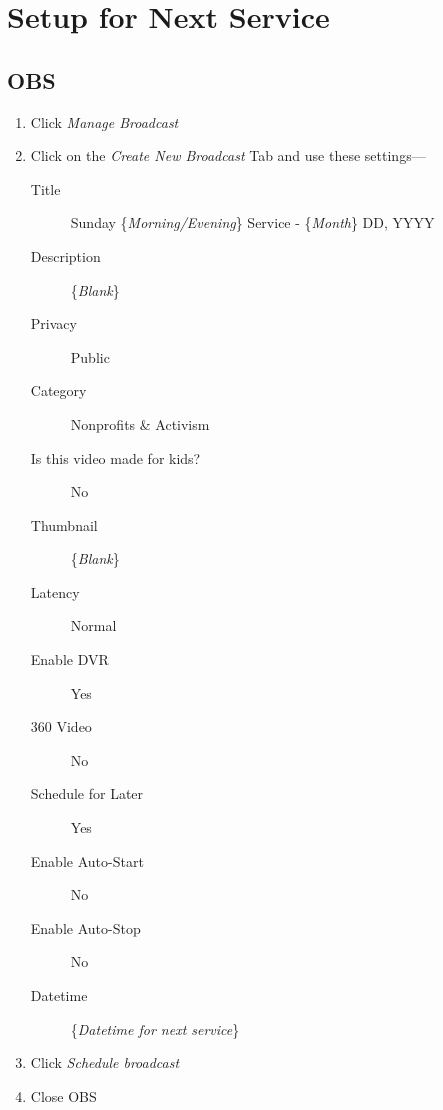 \documentclass[12pt]{article}
\begin{document}
\section{Setup for Next Service}

    \subsection{OBS}
    \begin{enumerate}
        \item Click \emph{Manage Broadcast}
        \item Click on the \emph{Create New Broadcast} Tab and use these settings---
        \begin{description}
            \item [Title] Sunday \{\emph{Morning/Evening}\} Service - \{\emph{Month}\} DD, YYYY
            \item [Description] \{\emph{Blank}\}
            \item [Privacy] Public
            \item [Category] Nonprofits \& Activism
            \item [Is this video made for kids?] No
            \item [Thumbnail] \{\emph{Blank}\}
            \item [Latency] Normal
            \item [Enable DVR] Yes
            \item [360 Video] No
            \item [Schedule for Later] Yes
            \item [Enable Auto-Start] No
            \item [Enable Auto-Stop] No
            \item [Datetime] \{\emph{Datetime for next service}\}
        \end{description}
        \item Click \emph{Schedule broadcast}
        \item Close OBS
    \end{enumerate}

\end{document}
